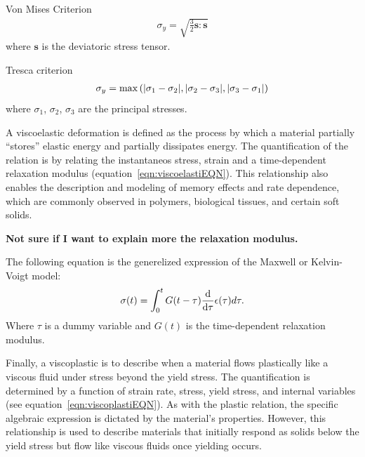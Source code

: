 Von Mises Criterion
\begin{gather}
    \sigma_y = \sqrt{\frac{3}{2}\bm{s}:\bm{s}}\label{eqn:vonMisesCriterion}
\end{gather}
where $\bm{s}$ is the deviatoric stress tensor.

Tresca criterion
\begin{gather}
   \sigma_y = \max\left(\abs{\sigma_1-\sigma_2},\abs{\sigma_2-\sigma_3},\abs{\sigma_3-\sigma_1}\right)\label{eqn:trescaCriterion}
\end{gather}
where $\sigma_1$, $\sigma_2$, $\sigma_3$ are the principal stresses.

A viscoelastic deformation is defined as the process by which a material partially ``stores'' elastic energy and partially dissipates energy.
The quantification of the relation is by relating the instantaneos stress, strain and a time-dependent relaxation modulus (equation~\eqref{eqn:viscoelastiEQN}).
This relationship also enables the description and modeling of memory effects and rate dependence, which are commonly observed in polymers, biological tissues, and certain soft solids.

\textbf{Not sure if I want to explain more the relaxation modulus.}

The following equation is the generelized expression of the Maxwell or Kelvin-Voigt model:
\begin{gather}
    \sigma(t) = \int_0^t G(t-\tau)\dv{\tau}\epsilon(\tau)d\tau\label{eqn:viscoelastiEQN}.
\end{gather}
Where $\tau$ is a dummy variable and $G(t)$ is the time-dependent relaxation modulus.

Finally, a viscoplastic is to describe when a material flows plastically like a viscous fluid under stress beyond the yield stress.
The quantification is determined by a function of strain rate, stress, yield stress, and internal variables (see equation~\eqref{eqn:viscoplastiEQN}).
As with the plastic relation, the specific algebraic expression is dictated by the material's properties.
However, this relationship is used to describe materials that initially respond as solids below the yield stress but flow like viscous fluids once yielding occurs.

